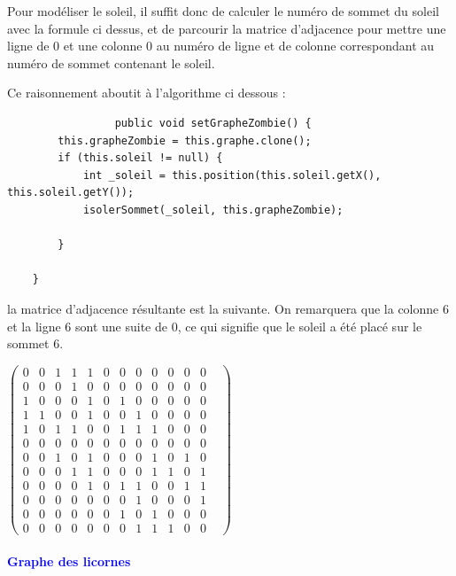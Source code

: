 \documentclass{report}
\begin{document}
				 Pour modéliser le soleil, il suffit donc de calculer le numéro de sommet du soleil avec la formule ci dessus, et de parcourir la matrice d'adjacence pour mettre une ligne de $0$ et une colonne $0$ au numéro de ligne et de colonne correspondant au numéro de sommet contenant le soleil.
				 
				 Ce raisonnement aboutit à l'algorithme ci dessous :\\
				 
				 \begin{verbatim}
				 public void setGrapheZombie() {
        this.grapheZombie = this.graphe.clone();
        if (this.soleil != null) {
            int _soleil = this.position(this.soleil.getX(), this.soleil.getY());
            isolerSommet(_soleil, this.grapheZombie);

        }

    }
				\end{verbatim}
				
				la matrice d'adjacence résultante est la suivante. On remarquera que la colonne 6 et la ligne 6 sont une suite de 0, ce qui signifie que le soleil a été placé sur le sommet 6.\\
				\begin{center}
				\setcounter{MaxMatrixCols}{20}
				$\begin{pmatrix}
			0&0&1&1&1&0&0&0&0&0&0&0&\\
			0&0&0&1&0&0&0&0&0&0&0&0&\\
			1&0&0&0&1&0&1&0&0&0&0&0&\\
			1&1&0&0&1&0&0&1&0&0&0&0&\\
			1&0&1&1&0&0&1&1&1&0&0&0&\\
			0&0&0&0&0&0&0&0&0&0&0&0&\\
			0&0&1&0&1&0&0&0&1&0&1&0&\\
			0&0&0&1&1&0&0&0&1&1&0&1&\\
			0&0&0&0&1&0&1&1&0&0&1&1&\\
			0&0&0&0&0&0&0&1&0&0&0&1&\\
			0&0&0&0&0&0&1&0&1&0&0&0&\\
			0&0&0&0&0&0&0&1&1&1&0&0&
				\end{pmatrix}$	
				\end{center}
											  
				
			
			\paragraph{\textcolor{blue}{Graphe des licornes}}
			
\end{document}
